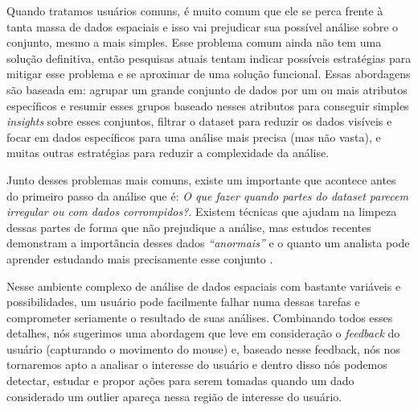 Quando tratamos usuários comuns, é muito comum que ele se perca frente à tanta massa de dados espaciais e isso vai prejudicar sua possível análise sobre o conjunto, mesmo a mais simples. Esse problema comum ainda não tem uma solução definitiva, então pesquisas atuais tentam indicar possíveis estratégias para mitigar esse problema e se aproximar de uma solução funcional. Essas abordagens são baseada em: agrupar um grande conjunto de dados por um ou mais atributos específicos e resumir esses grupos baseado nesses atributos para conseguir simples \textit{insights} sobre esses conjuntos, filtrar o dataset para reduzir os dados visíveis e focar em dados específicos para uma análise mais precisa (mas não vasta), e muitas outras estratégias para reduzir a complexidade da análise.


Junto desses problemas mais comuns, existe um importante que acontece antes do primeiro passo da análise que é: \textit{O que fazer quando partes do dataset parecem irregular ou com dados corrompidos?}. Existem técnicas que ajudam na limpeza dessas partes de forma que não prejudique a análise, mas estudos recentes demonstram a importância desses dados \textit{``anormais''} e o quanto um analista pode aprender estudando mais precisamente esse conjunto \cite{DBLP:journals/debu/FreireCVZ16}.


Nesse ambiente complexo de análise de dados espaciais com bastante variáveis e possibilidades, um usuário pode facilmente falhar numa dessas tarefas e comprometer seriamente o resultado de suas análises. Combinando todos esses detalhes, nós sugerimos uma abordagem que leve em consideração o \textit{feedback} do usuário (capturando o movimento do mouse) e, baseado nesse feedback, nós nos tornaremos apto a analisar o interesse do usuário e dentro disso nós podemos detectar, estudar e propor ações para serem tomadas quando um dado considerado um outlier apareça nessa região de interesse do usuário.

